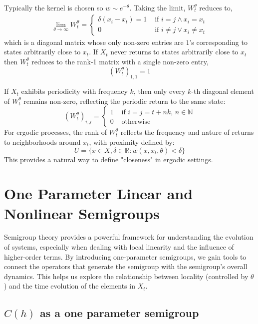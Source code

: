 \documentclass{article}
\newcommand{\N}{\mathbb{N}}
\begin{document}
Typically the kernel is chosen so $w \sim e^{-\theta}$. 
Taking the limit, $W_t^\theta$ reduces to,
\begin{align*}
    \lim_{\theta\rightarrow\infty} W_t^\theta = 
    \begin{cases} 
      \delta(x_i - x_t) = 1 &\text{ if }i=j \wedge x_i = x_t\\
      0 &\text{ if } i\neq j \vee x_i \neq x_t
   \end{cases}
\end{align*}
which is a diagonal matrix whose only non-zero entries are $1$'s corresponding to states arbitrarily close to $x_t$. If $X_t$ never returns to states arbitrarily close to $x_t$ then $W_t^\theta$ reduces to the rank-1 matrix with a single non-zero entry, 
$$
    (W_t^\theta)_{1,1} = 1
$$

If \( X_t \) exhibits periodicity with frequency \( k \), then only every \( k \)-th diagonal element of \( W_t^\theta \) remains non-zero, reflecting the periodic return to the same state:
$$
    (W_t^\theta)_{i,j} = 
    \begin{cases}
        1  &\text{ if } i=j=t+nk,\, n\in\N\\
        0  &\text{ otherwise}
    \end{cases}
$$
For ergodic processes, the rank of \( W_t^\theta \) reflects the frequency and nature of returns to neighborhoods around \( x_t \), with proximity defined by:
$$
    U = \{x \in X, \delta \in \mathbb{R}: w(x, x_t, \theta) < \delta\}
$$
This provides a natural way to define "closeness" in ergodic settings.

\section{One Parameter Linear and Nonlinear Semigroups}
Semigroup theory provides a powerful framework for understanding the evolution of systems, especially when dealing with local linearity and the influence of higher-order terms. By introducing one-parameter semigroups, we gain tools to connect the operators that generate the semigroup with the semigroup's overall dynamics. This helps us explore the relationship between locality (controlled by \( \theta \)) and the time evolution of the elements in \( X_t \).


\subsection{$C(h)$ as a one parameter semigroup}
\end{document}
